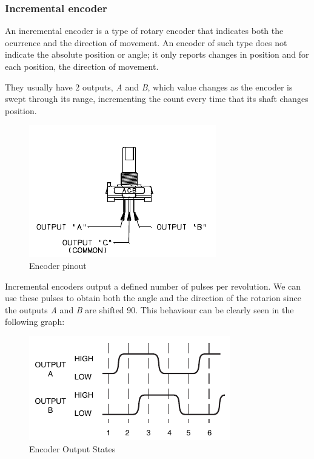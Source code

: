 \clearpage

\subsubsection{Incremental encoder}

An incremental encoder is a type of rotary encoder that indicates both the ocurrence and the direction of movement. An encoder of such type does not indicate the absolute position or angle; it only reports changes in position and for each position, the direction of movement. \medskip

They usually have 2 outputs, \textit{A} and \textit{B}, which value changes as the encoder is swept through its range, incrementing the count every time that its shaft changes position.\medskip

\vspace{-0.5cm}

\begin{figure}[H]
    \centering
    \includegraphics[scale = 1.3]{Graphics/VHDL/Practice 4/ENCODER_DRAWING.pdf}
    \caption{Encoder pinout ~\autocite{ENCODER}}
    \label{fig:ENCODER_PINOUT}
\end{figure}

Incremental encoders output a defined number of pulses per revolution. We can use these pulses to obtain both the angle and the direction of the rotarion since the outputs \textit{A} and \textit{B} are shifted 90\textdegree. This behaviour can be clearly seen in the following graph:\medskip

\begin{figure}[H]
    \centering
    \includegraphics[scale = 1.5]{Graphics/VHDL/Practice 4/ENCODER_POSITION.pdf}
    \caption{Encoder Output States ~\autocite{ENCODER}}
    \label{fig:ENCODER_STATES}
\end{figure}

